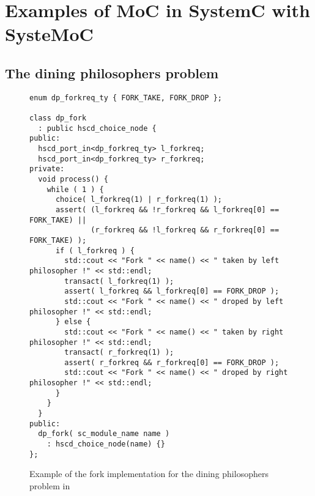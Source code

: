 
\section{Examples of MoC in SystemC with SysteMoC}\label{systemoc-examples}

\subsection{The dining philosophers problem}

\begin{figure}
\centering
\begin{verbatim}
enum dp_forkreq_ty { FORK_TAKE, FORK_DROP };

class dp_fork
  : public hscd_choice_node {
public:
  hscd_port_in<dp_forkreq_ty> l_forkreq;
  hscd_port_in<dp_forkreq_ty> r_forkreq;
private:
  void process() {
    while ( 1 ) {
      choice( l_forkreq(1) | r_forkreq(1) );
      assert( (l_forkreq && !r_forkreq && l_forkreq[0] == FORK_TAKE) ||
              (r_forkreq && !l_forkreq && r_forkreq[0] == FORK_TAKE) );
      if ( l_forkreq ) {
        std::cout << "Fork " << name() << " taken by left philosopher !" << std::endl;
        transact( l_forkreq(1) );
        assert( l_forkreq && l_forkreq[0] == FORK_DROP );
        std::cout << "Fork " << name() << " droped by left philosopher !" << std::endl;
      } else {
        std::cout << "Fork " << name() << " taken by right philosopher !" << std::endl;
        transact( r_forkreq(1) );
        assert( r_forkreq && r_forkreq[0] == FORK_DROP );
        std::cout << "Fork " << name() << " droped by right philosopher !" << std::endl;
      }
    }
  }
public:
  dp_fork( sc_module_name name )
    : hscd_choice_node(name) {}
};
\end{verbatim}
\caption{\label{dining-philosophers-fork-systemoc}
  Example of the fork implementation for the
  dining philosophers problem in \SysteMoC{}}
\end{figure}


